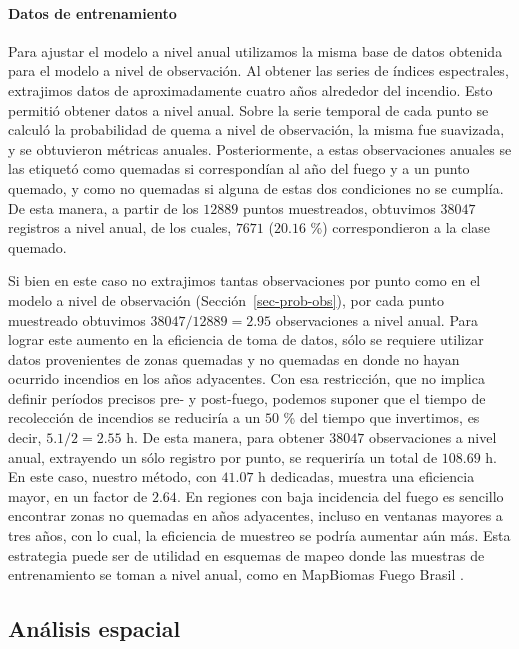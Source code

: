\documentclass[11pt,a4paper]{article}
\begin{document}
\FloatBarrier

\paragraph{Datos de entrenamiento}

Para ajustar el modelo a nivel anual utilizamos la misma base de datos obtenida para el modelo a nivel de observación. Al obtener las series de índices espectrales, extrajimos datos de aproximadamente cuatro años alrededor del incendio. Esto permitió obtener datos a nivel anual. Sobre la serie temporal de cada punto se calculó la probabilidad de quema a nivel de observación, la misma fue suavizada, y se obtuvieron métricas anuales. Posteriormente, a estas observaciones anuales se las etiquetó como quemadas si correspondían al año del fuego y a un punto quemado, y como no quemadas si alguna de estas dos condiciones no se cumplía. De esta manera, a partir de los $12889$ puntos muestreados, obtuvimos $38047$ registros a nivel anual, de los cuales, $7671$ ($20.16$ \%) correspondieron a la clase quemado.

Si bien en este caso no extrajimos tantas observaciones por punto como en el modelo a nivel de observación (Sección~\ref{sec-prob-obs}), por cada punto muestreado obtuvimos $38047 / 12889 = 2.95$ observaciones a nivel anual. Para lograr este aumento en la eficiencia de toma de datos, sólo se requiere utilizar datos provenientes de zonas quemadas y no quemadas en donde no hayan ocurrido incendios en los años adyacentes. Con esa restricción, que no implica definir períodos precisos pre- y post-fuego, podemos suponer que el tiempo de recolección de incendios se reduciría a un $50$ \% del tiempo que invertimos, es decir, $5.1 / 2 = 2.55$ h. De esta manera, para obtener $38047$ observaciones a nivel anual, extrayendo un sólo registro por punto, se requeriría un total de $108.69$ h. En este caso, nuestro método, con $41.07$ h dedicadas, muestra una eficiencia mayor, en un factor de $2.64$. En regiones con baja incidencia del fuego es sencillo encontrar zonas no quemadas en años adyacentes, incluso en ventanas mayores a tres años, con lo cual, la eficiencia de muestreo se podría aumentar aún más. Esta estrategia puede ser de utilidad en esquemas de mapeo donde las muestras de entrenamiento se toman a nivel anual, como en MapBiomas Fuego Brasil \parencite{alencar2022mapbiomas_fire}.  

\subsection{Análisis espacial}
\end{document}
